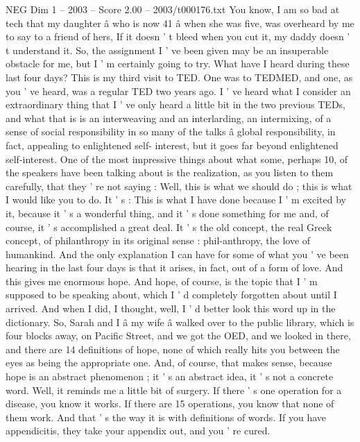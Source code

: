\begin{textsample}{NEG Dim 1 – 2003 – Score 2.00 – 2003/t000176.txt}  \label{ex:f1_neg_077}
You know, I am so bad at tech that my daughter â who is now 41 â when she was five, was overheard by me to say to a friend of hers, If it doesn ' t bleed when you cut it, my daddy doesn ' t understand it.
So, the assignment I ' ve been given may be an insuperable obstacle for me, but I ' m certainly going to try.
What have I heard during these last four days?
This is my third visit to TED.
One was to TEDMED, and one, as you ' ve heard, was a regular TED two years ago.
I ' ve heard what I consider an extraordinary thing that I ' ve only heard a little bit in the two previous TEDs, and what that is is an interweaving and an interlarding, an intermixing, of a sense of social responsibility in so many of the talks â global responsibility, in fact, appealing to enlightened self- interest, but it goes far beyond enlightened self-interest.
One of the most impressive things about what some, perhaps 10, of the speakers have been talking about is the realization, as you listen to them carefully, that they ' re not saying : Well, this is what we should do ; this is what I would like you to do.
It ' s : This is what I have done because I ' m excited by it, because it ' s a wonderful thing, and it ' s done something for me and, of course, it ' s accomplished a great deal.
It ' s the old concept, the real Greek concept, of philanthropy in its original sense : phil-anthropy, the love of humankind.
And the only explanation I can have for some of what you ' ve been hearing in the last four days is that it arises, in fact, out of a form of love.
And this gives me enormous hope.
And hope, of course, is the topic that I ' m supposed to be speaking about, which I ' d completely forgotten about until I arrived.
And when I did, I thought, well, I ' d better look this word up in the dictionary.
So, Sarah and I â my wife â walked over to the public library, which is four blocks away, on Pacific Street, and we got the OED, and we looked in there, and there are 14 definitions of hope, none of which really hits you between the eyes as being the appropriate one.
And, of course, that makes sense, because hope is an abstract phenomenon ; it ' s an abstract idea, it ' s not a concrete word.
Well, it reminds me a little bit of surgery.
If there ' s one operation for a disease, you know it works.
If there are 15 operations, you know that none of them work.
And that ' s the way it is with definitions of words.
If you have appendicitis, they take your appendix out, and you ' re cured.

\end{textsample}
